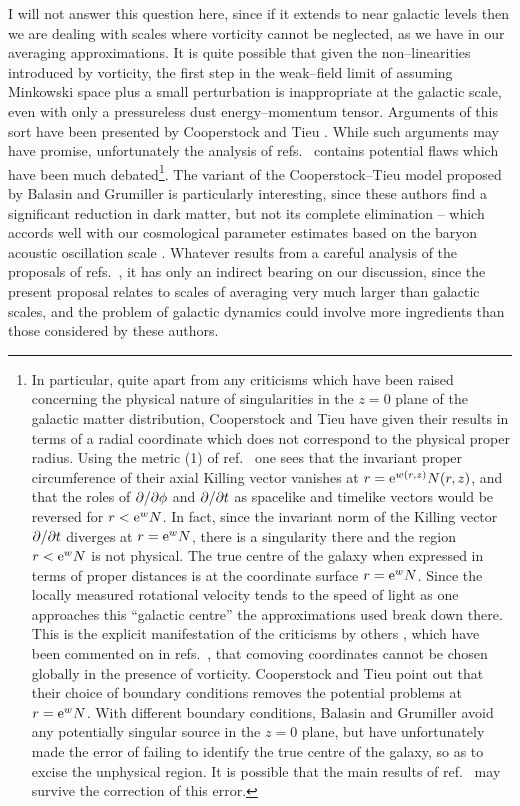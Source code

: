 \documentclass[12pt]{article}
\begin{document}
I will not answer this question here, since if it extends to near galactic
levels then we are dealing with scales where vorticity cannot be neglected,
as we have in our averaging approximations. It is quite possible that given
the non--linearities introduced by vorticity, the first step in the
weak--field limit of assuming Minkowski space plus a small perturbation is
inappropriate at the galactic scale, even with only a pressureless dust
energy--momentum tensor. Arguments of this sort have been presented by
Cooperstock and Tieu \cite{CT1,CT2}. While such arguments may have promise,
unfortunately the analysis of refs.\ \cite{CT1,CT2} contains potential
flaws which have been much debated\footnote{In particular, quite apart from
any criticisms which have been raised concerning the physical nature of
singularities in the $z=0$ plane of the galactic matter distribution,
Cooperstock and Tieu have given their results in terms of a
radial coordinate which does not correspond to the physical proper radius.
Using the metric (1) of ref.\ \cite{CT2} one sees that the invariant
proper circumference of their axial Killing vector vanishes at $r={\rm e}^{w(r,z)}
N(r,z)$, and that the roles of $\partial/\partial\phi$ and $\partial/\partial t$ as spacelike
and timelike vectors would be reversed for $r<{\rm e}^w N$. In fact, since the
invariant norm of the Killing vector $\partial/\partial t$ diverges at $r={\rm e}^w N$,
there is a singularity there and the region $r<{\rm e}^w N$
is not physical. The true centre of the galaxy when expressed in terms
of proper distances is at the coordinate surface $r={\rm e}^w N$. Since the
locally measured rotational velocity tends to the speed of light as one
approaches this ``galactic centre'' the approximations used break down there.
This is the explicit manifestation of the criticisms by others \cite{dust},
which have been commented on in refs.\ \cite{CT1,CT2},
that comoving coordinates cannot be chosen globally in the presence of
vorticity. Cooperstock and Tieu point out that their choice of boundary
conditions removes the potential problems at $r={\rm e}^w N$. With different
boundary conditions, Balasin and Grumiller \cite{BG}
avoid any potentially singular source in
the $z=0$ plane, but have unfortunately made the error of failing to
identify the true centre of the galaxy, so as to excise the unphysical region.
It is possible that the main results of ref.\ \cite{BG} may survive the
correction of this error.}.
The variant of the Cooperstock--Tieu model proposed by Balasin and Grumiller
\cite{BG} is particularly interesting, since these authors find a significant
reduction in dark matter, but not its complete elimination -- which accords
well with our cosmological parameter estimates based on the baryon acoustic
oscillation scale \cite{paper2}.
Whatever results from a careful analysis of the proposals of
refs.\ \cite{CT1,BG}, it has only an indirect bearing on our discussion,
since the present proposal relates to scales of averaging very much
larger than galactic scales, and the problem of galactic dynamics
could involve more ingredients than those considered by these authors.
\end{document}
